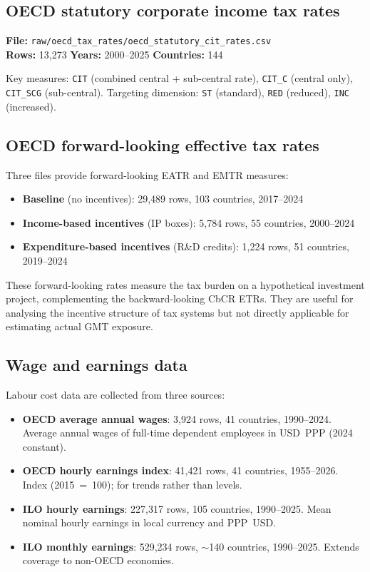 \documentclass[11pt,a4paper]{article}
\newcommand{\code}[1]{\texttt{#1}}
\begin{document}
\subsection{OECD statutory corporate income tax rates}\label{app:cit}

\textbf{File:} \code{raw/oecd\_tax\_rates/oecd\_statutory\_cit\_rates.csv}\\
\textbf{Rows:} 13,273 \quad \textbf{Years:} 2000--2025 \quad \textbf{Countries:} 144

Key measures: \code{CIT} (combined central + sub-central rate), \code{CIT\_C} (central only), \code{CIT\_SCG} (sub-central). Targeting dimension: \code{ST} (standard), \code{RED} (reduced), \code{INC} (increased).

\subsection{OECD forward-looking effective tax rates}\label{app:etr}

Three files provide forward-looking EATR and EMTR measures:

\begin{itemize}[noitemsep]
\item \textbf{Baseline} (no incentives): 29,489 rows, 103 countries, 2017--2024
\item \textbf{Income-based incentives} (IP boxes): 5,784 rows, 55 countries, 2000--2024
\item \textbf{Expenditure-based incentives} (R\&D credits): 1,224 rows, 51 countries, 2019--2024
\end{itemize}

These forward-looking rates measure the tax burden on a hypothetical investment project, complementing the backward-looking CbCR ETRs. They are useful for analysing the incentive structure of tax systems but not directly applicable for estimating actual GMT exposure.

\subsection{Wage and earnings data}\label{app:wages}

Labour cost data are collected from three sources:

\begin{itemize}[noitemsep]
\item \textbf{OECD average annual wages}: 3,924 rows, 41 countries, 1990--2024. Average annual wages of full-time dependent employees in USD~PPP (2024 constant).
\item \textbf{OECD hourly earnings index}: 41,421 rows, 41 countries, 1955--2026. Index (2015~=~100); for trends rather than levels.
\item \textbf{ILO hourly earnings}: 227,317 rows, 105 countries, 1990--2025. Mean nominal hourly earnings in local currency and PPP~USD.
\item \textbf{ILO monthly earnings}: 529,234 rows, $\sim$140 countries, 1990--2025. Extends coverage to non-OECD economies.
\end{itemize}
\end{document}
